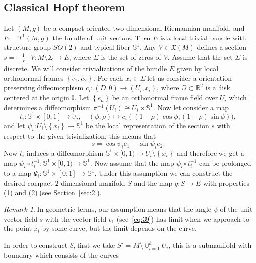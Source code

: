 \documentclass[12pt,letterpaper]{amsart}
\theoremstyle{definition}
\theoremstyle{plain}
\theoremstyle{remark}
\newtheorem{rem}{Remark}
\begin{document}
\subsection{Classical Hopf theorem}
\label{subsec:4_1}
Let $(M, g)$ be a compact oriented two-dimensional Riemannian manifold, and $E = T^1(M, g)$ the bundle of unit vectors.
Then $E$ is a local trivial bundle with structure group $SO(2)$ and typical fiber $\mathbb{S}^1$.
Any $V \in \mathfrak{X}(M)$ defines a section $s = \frac{1}{\|V\|}V : M \setminus \Sigma \to E$, where $\Sigma$ is the set of zeros of $V$.
Assume that the set $\Sigma$ is discrete.
We will consider trivializations of the bundle $E$ given by local orthonormal frames $\left\{ e_1, e_2 \right\}$.
For each $x_i \in \Sigma$ let us consider a orientation preserving diffeomorphism $c_i : (D, 0) \to (U_i, x_i)$, where $D \subset \mathbb{R}^2$ is a disk centered at the origin $0$.
Let $\left\{ e_a \right\}$ be an orthonormal frame field over $U_i$ which determines a diffeomorphism $\pi^{-1}(U_i) \cong U_i \times \mathbb{S}^1$.
Now let consider a map
\begin{equation}
t_i : \mathbb{S}^1 \times [0, 1] \to U_i, \quad (\phi, \rho) \mapsto c_i( (1-\rho)\cos\phi, (1-\rho)\sin\phi) ),
\label{eq:38}
\end{equation}
and let $\psi_i : U_i\setminus\left\{ x_i \right\} \to \mathbb{S}^1$ be the local representation of the section $s$ with respect to the given trivialization, this means that
\begin{equation}
s = \cos\psi_i e_1 + \sin\psi_i e_2.
\label{eq:39}
\end{equation}
Now $t_i$ induces a diffeomorphism $\mathbb{S}^1 \times [0, 1) \to U_i \setminus \left\{ x_i \right\}$ and therefore we get a map $\psi_i \circ t_i^{-1} : \mathbb{S}^1 \times [0, 1) \to \mathbb{S}^1$.
Now assume that the map $\psi_i \circ t_i^{-1}$ can be prolonged to a map $\Psi_i: \mathbb{S}^1 \times [0, 1] \to \mathbb{S}^1$.
Under this assumption we can construct the desired compact $2$-dimensional manifold $S$ and the map $q : S \to E$ with properties (1) and (2) (see Section~\ref{sec:2}).
\begin{rem}
In geometric terms, our assumption means that the angle $\psi$ of the unit vector field $s$ with the vector field $e_1$ (see~\eqref{eq:39}) has limit when we approach to the point $x_i$ by some curve, but the limit depends on the curve.
\label{rem:6}
\end{rem}
In order to construct $S$, first we take $S' = M \setminus \cup_{i=1}^k U_i$, this is a submanifold with boundary which consists of the curves
\end{document}
